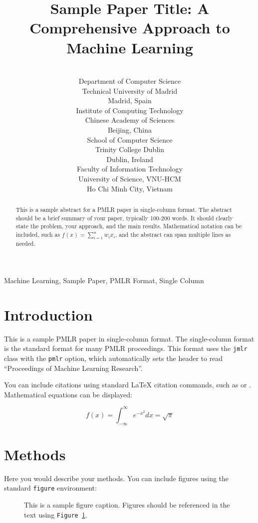 \documentclass[pmlr]{jmlr} %
\title{Sample Paper Title: A Comprehensive Approach to Machine Learning}
\author{\Name{Mar\'ia Garc\'ia-L\'opez} \Email{maria.garcia@example.edu}\\
  \addr Department of Computer Science\\
  Technical University of Madrid\\
  Madrid, Spain
  \AND
  \Name{Li Wei} \Email{li.wei@example.edu.cn}\\
  \addr Institute of Computing Technology\\
  Chinese Academy of Sciences\\
  Beijing, China
  \AND
  \Name{Jamal O'Brien-Williams} \Email{jamal.obrien@example.ie}\\
  \addr School of Computer Science\\
  Trinity College Dublin\\
  Dublin, Ireland
  \AND
  \Name{Nguy\~{e}n Th\d{i} Minh} \Email{nguyen.minh@example.edu.vn}\\
  \addr Faculty of Information Technology\\
  University of Science, VNU-HCM\\
  Ho Chi Minh City, Vietnam
}
\begin{document}
\maketitle

\begin{abstract}
This is a sample abstract for a PMLR paper in single-column format. 
The abstract should be a brief summary of your paper, typically 
100-200 words. It should clearly state the problem, your approach, 
and the main results. Mathematical notation can be included, such as 
$f(x) = \sum_{i=1}^{n} w_i x_i$, and the abstract can span multiple 
lines as needed.
\end{abstract}

\begin{keywords}
Machine Learning, Sample Paper, PMLR Format, Single Column
\end{keywords}

\section{Introduction}

This is a sample PMLR paper in single-column format. The single-column
format is the standard format for many PMLR proceedings. This format
uses the \texttt{jmlr} class with the \texttt{pmlr} option, which
automatically sets the header to read ``Proceedings of Machine Learning
Research''.

You can include citations using standard \LaTeX{} citation commands,
such as \citet{example2023} or \citep{example2023}. Mathematical equations can be displayed:

\begin{equation}
  \label{eq:example}
  f(x) = \int_{-\infty}^{\infty} e^{-x^2} dx = \sqrt{\pi}
\end{equation}

\section{Methods}

Here you would describe your methods. You can include figures using
the standard \texttt{figure} environment:

\begin{figure}[htbp]
  \centering
  \caption{This is a sample figure caption. Figures should be
    referenced in the text using \texttt{Figure~\ref{fig:sample}}.}
  \label{fig:sample}
\end{figure}
\end{document}
